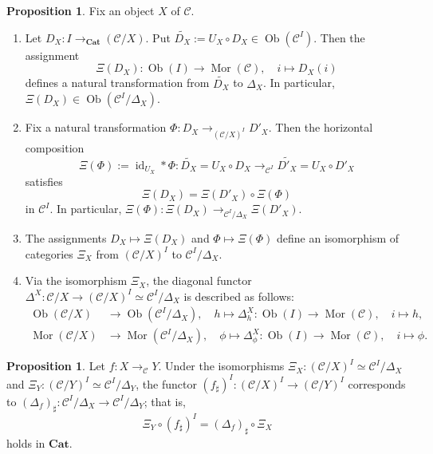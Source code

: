 \documentclass[12pt, a4paper]{amsart}
\theoremstyle{definition}
\newtheorem{proposition}[theorem]{Proposition}
\newcommand{\id}{\mathop{\mathrm{id}}\nolimits}
\newcommand{\Mor}{\mathop{\mathrm{Mor}}\nolimits}
\newcommand{\Ob}{\mathop{\mathrm{Ob}}\nolimits}
\newcommand{\Cat}{{\mathbf{Cat}}}
\begin{document}
\begin{proposition}\label{proposition:CXI}
Fix an object $X$ of $\mathcal{C}$.
\begin{enumerate}
    \item Let $D_X : I \rightarrow_{\Cat} (\mathcal{C}/X)$. Put $\widetilde{D_X} := U_X \circ D_X \in \Ob(\mathcal{C}^I)$. Then the assignment
    \[
    \Xi(D_X) : \Ob(I) \rightarrow \Mor(\mathcal{C}), \quad i \mapsto D_X(i)
    \]
    defines a natural transformation from $\widetilde{D_X}$ to $\Delta_X$. In particular, $\Xi(D_X) \in \Ob(\mathcal{C}^I/{\Delta_X})$.
    \item Fix a natural transformation $\Phi : D_X \rightarrow_{(\mathcal{C}/X)^I} D'_X$. Then the horizontal composition
    \[
    \Xi(\Phi) := \id_{U_X} * \Phi : \widetilde{D_X} = U_X \circ D_X \rightarrow_{\mathcal{C}^I} \widetilde{D'_X} = U_X \circ D'_X
    \]
    satisfies
    \[
    \Xi(D_X) = \Xi(D'_X) \circ \Xi(\Phi)
    \]
    in $\mathcal{C}^I$. In particular, $\Xi(\Phi) : \Xi(D_X) \rightarrow_{\mathcal{C}^I/\Delta_X} \Xi(D'_X)$.
    \item The assignments $D_X \mapsto \Xi(D_X)$ and $\Phi \mapsto \Xi(\Phi)$ define an isomorphism of categories $\Xi_X$ from $(\mathcal{C}/X)^I$ to $\mathcal{C}^I/\Delta_X$.
    \item Via the isomorphism $\Xi_X$, the diagonal functor $\Delta^{X} : \mathcal{C}/X \rightarrow (\mathcal{C}/X)^I \simeq \mathcal{C}^I/\Delta_X$ is described as follows:
    \begin{align*}
    \Ob(\mathcal{C}/X) &\rightarrow \Ob(\mathcal{C}^I/\Delta_X), \quad h \mapsto \Delta^{X}_h : \Ob(I) \rightarrow \Mor(\mathcal{C}), \quad i \mapsto h, \\
    \Mor(\mathcal{C}/X) &\rightarrow \Mor(\mathcal{C}^I/\Delta_X), \quad \phi \mapsto \Delta^{X}_\phi : \Ob(I) \rightarrow \Mor(\mathcal{C}), \quad i \mapsto \phi.
    \end{align*}
\end{enumerate}
\end{proposition}

\begin{proposition}\label{proposition:fsharpI}
Let $f : X \rightarrow_{\mathcal{C}} Y$. Under the isomorphisms $\Xi_X : (\mathcal{C}/X)^I \simeq \mathcal{C}^I/\Delta_X$ and $\Xi_Y : (\mathcal{C}/Y)^I \simeq \mathcal{C}^I/\Delta_Y$, the functor $(f_\sharp)^I : (\mathcal{C}/X)^I \rightarrow (\mathcal{C}/Y)^I$ corresponds to $(\Delta_f)_\sharp : \mathcal{C}^I/{\Delta_X} \rightarrow \mathcal{C}^I/{\Delta_Y}$; that is,
\[
\Xi_Y \circ (f_\sharp)^I = (\Delta_f)_\sharp \circ \Xi_X
\]
holds in $\Cat$.
\end{proposition}
\end{document}
